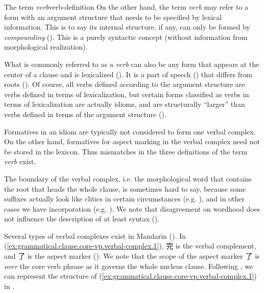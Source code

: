 \documentclass[UTF8, a4paper, oneside, scheme=plain, 12pt]{ctexrep}
\newcommand*{\term}[1]{\emph{#1}}
\begin{document}
\begin{theorybox}{The term \term{verb}}{verb-definition}
    On the other hand, the term \term{verb} may refer to a form with an argument structure
    that needs to be specified by lexical information.
    This is to say its internal structure, if any,
    can only be formed by \term{compounding} ().
    This is a purely syntactic concept (without information from morphological realization).
    
    What is commonly referred to as a \term{verb} 
    can also be any form that appears at the center of a clause and is lexicalized ().
    It is a part of speech () that differs from roots ().
    Of course, all verbs defined according to the argument structure are verbs defined in terms of lexicalization,
    but certain forms classified as verbs in terms of lexicalization are actually idioms,
    and are structurally ``larger'' than verbs defined in terms of the argument structure
    ().

    Formatives in an idiom are typically not considered to form one verbal complex.
    On the other hand, formatives for aspect marking in the verbal complex need not be stored in the lexicon.
    Thus mismatches in the three definitions of the term \term{verb} exist.
\end{theorybox}

The boundary of the verbal complex, i.e. the morphological word that contains the root that heads the whole clause,
is sometimes hard to say,
because some suffixes actually look like clitics in certain circumstances
(e.g. ),
and in other cases we have incorporation (e.g. ).
We note that disagreement on wordhood does not influence the description of at least syntax
().

Several types of verbal complexes exist in Mandarin
().
In (\ref{ex:grammatical.clause.core-vp.verbal-complex.1}),
完 is the verbal complement, and 了 is the aspect marker
().
We note that the scope of the aspect marker 了 is \emph{over} the core verb phrase
as it governs the whole nucleus clause.
Following ,
we can represent the structure of (\ref{ex:grammatical.clause.core-vp.verbal-complex.1})
in .
\end{document}
